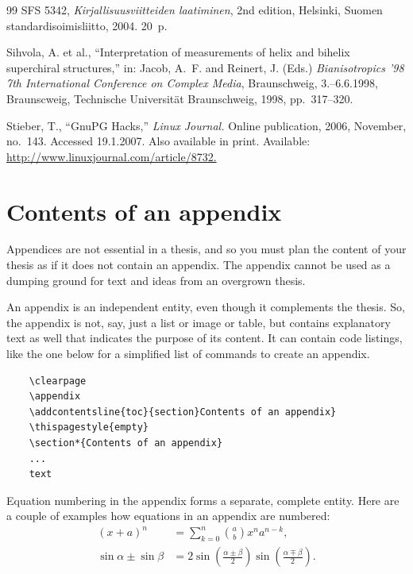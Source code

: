 \documentclass[english, 12pt, a4paper, sci, utf8, a-2b, online]{aaltothesis}
\begin{document}
\begin{thebibliography}{99}
   SFS 5342, \textit{Kirjallisuusviitteiden laatiminen}, 2nd 
	edition, Helsinki, Suomen standardisoimisliitto, 2004. 20~p.

   Sihvola, A. et al., ``Interpretation of measurements of 
	helix and bihelix superchiral structures,'' in: Jacob, A.\ F. and Reinert, 
	J. (Eds.) \textit{Bianisotropics '98 7th International Conference on Complex
	Media}, Braunschweig, 3.--6.6.1998, Braunscweig, Technische Universität 
	Braunschweig, 1998, pp.\ 317--320.

   Stieber, T., ``GnuPG Hacks,'' \textit{Linux Journal.} Online
	publication, 2006, November, no.~143. Accessed 19.1.2007. Also available in 
	print. Available: \url{http://www.linuxjournal.com/article/8732.}

\end{thebibliography}

\clearpage

\thesisappendix

\section{Contents of an appendix}
\label{app:contents}

Appendices are not essential in a thesis, and so you must plan the content of 
your thesis as if it does not contain an appendix. The appendix cannot be used 
as a dumping ground for text and ideas from an overgrown thesis.

An appendix is an independent entity, even though it complements the thesis. 
So, the appendix is not, say, just a list or image or table, but contains 
explanatory text as well that indicates the purpose of its content. It can 
contain code listings, like the one below for a simplified list of commands to 
create an appendix.
\begin{verbatim}
	\clearpage
	\appendix
	\addcontentsline{toc}{section}Contents of an appendix}
	\thispagestyle{empty}
	\section*{Contents of an appendix}
	...
	text
\end{verbatim}

Equation numbering in the appendix forms a separate, complete entity. Here are a couple of examples how equations in an appendix are numbered:
\begin{align}
	(x+a)^n &= \sum_{k=0}^n \binom{a}{b} x^n a^{n-k}, \label{appeq:1}\\
	\sin\alpha \pm \sin\beta &= 2\sin\left(\frac{\alpha\pm\beta}{2}\right)
	\sin\left(\frac{\alpha\mp\beta}{2}\right). \label{liitekaava2}
\end{align}
\end{document}
